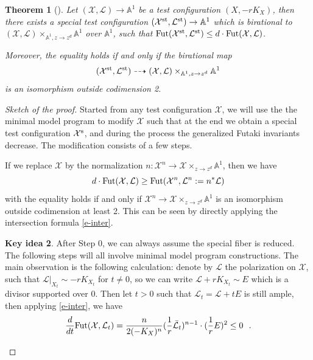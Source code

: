 \documentclass[12pt,reqno]{amsart}%
\newcommand{\cX}{{\mathcal{X}}}
\newcommand{\cL}{{\mathcal{L}}}
\newtheorem{thm}{Theorem}[section]
\theoremstyle{definition}
\newtheorem{keyidea}[thm]{Key idea}
\theoremstyle{remark}
\newcommand{\Fut}{{\rm Fut}}
\begin{document}
\begin{thm}[{\cite{LX14}}]\label{t-specialdegeneration}
Let $(\mathcal{X},\mathcal{L})\to \mathbb{A}^1$ be a test configuration $(X,-rK_X)$, then there exists a special test configuration $(\mathcal{X}^{{\rm st}},\mathcal{L}^{{\rm st}})\to \mathbb{A}^1$ which is birational to $(\mathcal{X},\mathcal{L})\times_{\mathbb{A}^1, z\to z^d} \mathbb{A}^1$ over $\mathbb{A}^1$, such that $\Fut(\mathcal{X}^{{\rm st}},\mathcal{L}^{{\rm st}})\le d\cdot \Fut(\mathcal{X},\mathcal{L})$.

Moreover, the equality holds if and only if the birational map 
$$(\mathcal{X}^{{\rm st}},\mathcal{L}^{{\rm st}}) \dasharrow (\mathcal{X},\mathcal{L})\times_{\mathbb{A}^1, z\to z^d} \mathbb{A}^1$$ is an isomorphism outside codimension 2.
\end{thm}
\begin{proof}[Sketch of the proof]Started from any test configuration $\cX$, we will use the the minimal model program to modify $\cX$ such that at the end we obtain a special test configuration $\cX^{\rm s}$, and during the process the generalized Futaki invariants decrease. The modification consists of a few steps.

 If we replace $\cX$ by the normalization $n\colon \cX^n\to \cX\times_{z\to z^d}\mathbb{A}^1$, then we have 
$$d\cdot \Fut(\cX,\cL )\ge \Fut(\cX^n,\cL^n:=n^*\cL)$$ with the equality holds if and only if $\cX^n\to\cX\times_{z\to z^d}\mathbb{A}^1$ is an isomorphism outside codimension at least 2. This can be seen by directly applying the intersection formula \eqref{e-inter}.

\begin{keyidea}After Step 0, we can always assume the special fiber is reduced. The following steps will all involve minimal model program constructions. The main observation is the following calculation: denote by $\cL$ the polarization on $\cX$, such that $\cL|_{X_t}\sim -rK_{X_t}$ for $t\neq 0$, so we can write $\cL+rK_{X_t}\sim E$ which is a divisor supported over $0$. Then let $t>0$ such that $\cL_t=\cL+tE$ is still ample, then applying \eqref{e-inter}, we have
\begin{eqnarray}\label{e-decreasing}
\frac{d}{dt}\Fut(\cX,\cL_t) =\frac{n}{2(-K_X)^n}(\frac{1}{r}\bar{\cL}_t)^{n-1}\cdot (\frac{1}{r}E)^2\le 0\ \ .
\end{eqnarray}
\end{keyidea}


\end{proof}
\end{document}
